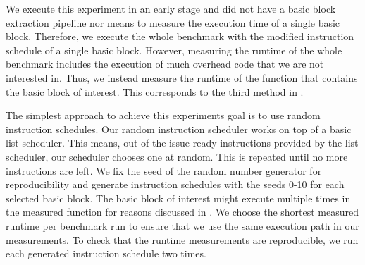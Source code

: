 We execute this experiment in an early stage and did not have a basic block extraction pipeline nor means to measure the execution time of a single basic block.
Therefore, we execute the whole benchmark with the modified instruction schedule of a single basic block.
However, measuring the runtime of the whole benchmark includes the execution of much overhead code that we are not interested in.
Thus, we instead measure the runtime of the function that contains the basic block of interest.
This corresponds to the third method in .

The simplest approach to achieve this experiments goal is to use random instruction schedules.
Our random instruction scheduler works on top of a basic list scheduler.
This means, out of the issue-ready instructions provided by the list scheduler, our scheduler chooses one at random.
This is repeated until no more instructions are left.
We fix the seed of the random number generator for reproducibility and generate instruction schedules with the seeds 0-10 for each selected basic block.
The basic block of interest might execute multiple times in the measured function for reasons discussed in .
We choose the shortest measured runtime per benchmark run to ensure that we use the same execution path in our measurements.
To check that the runtime measurements are reproducible, we run each generated instruction schedule two times.


